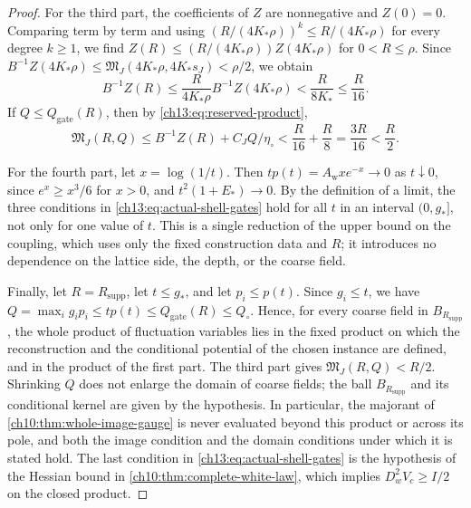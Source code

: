 \begin{proof}
For the third part, the coefficients of $Z$ are nonnegative and $Z(0)=0$. Comparing term by term and using $(R/(4K_*\rho))^k\le R/(4K_*\rho)$ for every degree $k\ge1$, we find $Z(R)\le(R/(4K_*\rho))Z(4K_*\rho)$ for $0<R\le\rho$. Since $B^{-1}Z(4K_*\rho)\le\mathfrak M_J(4K_*\rho,4K_*s_J)<\rho/2$, we obtain
\[
 B^{-1}Z(R)\le\frac{R}{4K_*\rho}B^{-1}Z(4K_*\rho)<\frac{R}{8K_*}\le\frac R{16}.
\]
If $Q\le Q_{\mathrm{gate}}(R)$, then by \eqref{ch13:eq:reserved-product},
\[
 \mathfrak M_J(R,Q)\le B^{-1}Z(R)+C_JQ/\eta_\circ<\frac R{16}+\frac R8=\frac{3R}{16}<\frac R2.
\]

For the fourth part, let $x=\log(1/t)$. Then $tp(t)=A_{\mathrm w}xe^{-x}\to0$ as $t\downarrow0$, since $e^x\ge x^3/6$ for $x>0$, and $t^2(1+E_*)\to0$. By the definition of a limit, the three conditions in \eqref{ch13:eq:actual-shell-gates} hold for all $t$ in an interval $(0,g_*]$, not only for one value of $t$. This is a single reduction of the upper bound on the coupling, which uses only the fixed construction data and $R$; it introduces no dependence on the lattice side, the depth, or the coarse field.

Finally, let $R=R_{\mathrm{supp}}$, let $t\le g_*$, and let $p_i\le p(t)$. Since $g_i\le t$, we have $Q=\max_ig_ip_i\le tp(t)\le Q_{\mathrm{gate}}(R)\le Q_\circ$. Hence, for every coarse field in $B_{R_{\mathrm{supp}}}$, the whole product of fluctuation variables lies in the fixed product on which the reconstruction and the conditional potential of the chosen instance are defined, and in the product of the first part. The third part gives $\mathfrak M_J(R,Q)<R/2$. Shrinking $Q$ does not enlarge the domain of coarse fields; the ball $B_{R_{\mathrm{supp}}}$ and its conditional kernel are given by the hypothesis. In particular, the majorant of \cref{ch10:thm:whole-image-gauge} is never evaluated beyond this product or across its pole, and both the image condition and the domain conditions under which it is stated hold. The last condition in \eqref{ch13:eq:actual-shell-gates} is the hypothesis of the Hessian bound in \cref{ch10:thm:complete-white-law}, which implies $D_w^2V_c\ge I/2$ on the closed product.
\end{proof}

